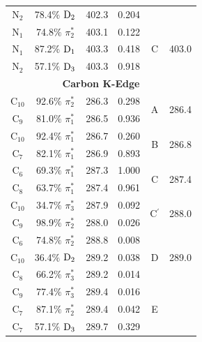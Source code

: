 \documentclass[12pt]{article}
\begin{document}
\begin{table}[!ht]
\begin{tabular*}{8.5cm}{@{\extracolsep{\fill} }cccccc}
    N$_2$
 &   78.4$\%$ $\rm D_2$  & 402.3 & 0.204
 \vspace{0.05in}\\ 
    N$_1$
 &   74.8$\%$ $\pi_2^*$  & 403.1 & 0.122 & \multirow{3}{*}{C} & \multirow{3}{*}{403.0} \\
    N$_1$
 &   87.2$\%$ $\rm D_1$  & 403.3 & 0.418 \\
    N$_2$
 &   57.1$\%$ $\rm D_3$  & 403.3 & 0.918
 \vspace{0.05in}\\
 \multicolumn{6}{c}{\textbf{Carbon K-Edge}} \vspace{0.05in}\\
     C$_{10}$
 &   92.6$\%$ $\pi_2^*$  & 286.3 & 0.298 & \multirow{2}{*}{A} & \multirow{2}{*}{286.4}\\
    C$_9$
 &   81.0$\%$ $\pi_1^*$  & 286.5 & 0.936 
 \vspace{0.05in}\\
    C$_{10}$
 &   92.4$\%$ $\pi_1^*$  & 286.7 & 0.260 &  \multirow{2}{*}{B} &  \multirow{2}{*}{286.8} \\
    C$_7$
 &   82.1$\%$ $\pi_1^*$  & 286.9 & 0.893 
 \vspace{0.05in}\\
    C$_6$
 &   69.3$\%$ $\pi_1^*$  & 287.3 & 1.000 &  \multirow{2}{*}{C} &  \multirow{2}{*}{287.4}\\
    C$_8$
 &   63.7$\%$ $\pi_1^*$  & 287.4 & 0.961 
 \vspace{0.05in}\\
    C$_{10}$
 &   34.7$\%$ $\pi_3^*$  & 287.9 & 0.092 & \multirow{2}{*}{C$^{\prime}$} &  \multirow{2}{*}{288.0}\\
    C$_9$
 &   98.9$\%$ $\pi_2^*$
 & 288.0 & 0.026 
 \vspace{0.05in}\\
    C$_6$
 &   74.8$\%$ $\pi_2^*$  & 288.8 & 0.008 & \multirow{3}{*}{D} & \multirow{3}{*}{289.0} \\
    C$_{10}$
 &   36.4$\%$ $\rm D_2$  & 289.2 & 0.038 \\
    C$_8$
 &   66.2$\%$ $\pi_3^*$  & 289.2 & 0.014 
 \vspace{0.05in}\\
    C$_9$
 &   77.4$\%$ $\pi_3^*$  & 289.4 & 0.016 & \multirow{3}{*}{E} \\
    C$_7$
 &   87.1$\%$ $\pi_2^*$  & 289.4 & 0.042 \\
    C$_7$
 &   57.1$\%$ $\rm D_3$  & 289.7 & 0.329 
 \vspace{0.05in}\\ 

\end{tabular*}
\end{table}
\end{document}
